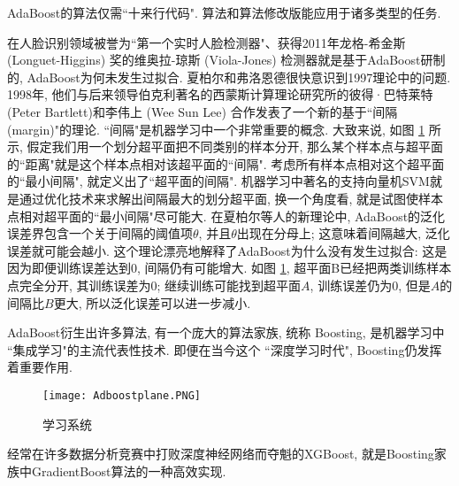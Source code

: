 AdaBoost的算法仅需“十来行代码". 算法和算法修改版能应用于诸多类型的任务.
\begin{example}
在人脸识别领域被誉为“第一个实时人脸检测器"、获得2011年龙格-希金斯 (Longuet-Higgins) 奖的维奥拉-琼斯 (Viola-Jones) 检测器就是基于AdaBoost研制的, AdaBoost为何未发生过拟合. 
夏柏尔和弗洛恩德很快意识到1997理论中的问题. 1998年, 他们与后来领导伯克利著名的西蒙斯计算理论研究所的彼得·巴特莱特 (Peter Bartlett)和李伟上 (Wee Sun Lee) 合作发表了一个新的基于“间隔 (margin)"的理论.
“间隔"是机器学习中一个非常重要的概念. 大致来说, 如图 \ref{AI32Adboostplane} 所示, 假定我们用一个划分超平面把不同类别的样本分开, 那么某个样本点与超平面的“距离"就是这个样本点相对该超平面的“间隔".
考虑所有样本点相对这个超平面的“最小间隔", 就定义出了“超平面的间隔".
机器学习中著名的支持向量机SVM就是通过优化技术来求解出间隔最大的划分超平面, 换一个角度看, 就是试图使样本点相对超平面的“最小间隔"尽可能大.
在夏柏尔等人的新理论中, AdaBoost的泛化误差界包含一个关于间隔的阈值项$\theta$, 并且$\theta$出现在分母上; 这意味着间隔越大, 泛化误差就可能会越小.
这个理论漂亮地解释了AdaBoost为什么没有发生过拟合:
这是因为即便训练误差达到0, 间隔仍有可能增大. 如图 \ref{AI32Adboostplane}, 超平面B已经把两类训练样本点完全分开, 其训练误差为0;
继续训练可能找到超平面$A$, 训练误差仍为0, 但是$A$的间隔比$B$更大, 所以泛化误差可以进一步减小.

AdaBoost衍生出许多算法, 有一个庞大的算法家族, 统称 Boosting, 是机器学习中 ``集成学习"的主流代表性技术.
即便在当今这个 ``深度学习时代", Boosting仍发挥着重要作用. 
\begin{figure}[H]
    \begin{center}
    \texttt{[image: Adboostplane.PNG]}
    \end{center}
    \vspace{-0.2cm}
    \caption{学习系统}
    \label{AI32Adboostplane}
\end{figure}
\end{example}
\begin{example}
    经常在许多数据分析竞赛中打败深度神经网络而夺魁的XGBoost, 就是Boosting家族中GradientBoost算法的一种高效实现. 
\end{example}


